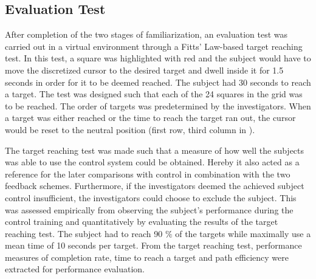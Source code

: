 \subsection{Evaluation Test} \label{sec:meth:contest}

After completion of the two stages of familiarization, an evaluation test was carried out in a virtual environment through a Fitts' Law-based target reaching test. In this test, a square was highlighted with red and the subject would have to move the discretized cursor to the desired target and dwell inside it for 1.5 seconds in order for it to be deemed reached. The subject had 30 seconds to reach a target. The test was designed such that each of the 24 squares in the grid was to be reached. The order of targets was predetermined by the investigators. When a target was either reached or the time to reach the target ran out, the cursor would be reset to the neutral position (first row, third column in ). 

The target reaching test was made such that a measure of how well the subjects was able to use the control system could be obtained. Hereby it also acted as a reference for the later comparisons with control in combination with the two feedback schemes. Furthermore, if the investigators deemed the achieved subject control insufficient, the investigators could choose to exclude the subject. This was assessed empirically from observing the subject's performance during the control training and quantitatively by evaluating the results of the target reaching test. The subject had to reach 90 $\percent$ of the targets while maximally use a mean time of 10 seconds per target. From the target reaching test, performance measures of completion rate, time to reach a target and path efficiency were extracted for performance evaluation.

